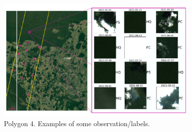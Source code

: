 \documentclass{beamer}
\begin{document}
\begin{frame}
    \begin{figure}
        \includegraphics[width=10cm]{Figures/v3/labeling/polygon_11.pdf}
        \caption{Polygon 4. Examples of some observation/labels.}  
        \centering
    \end{figure}
\end{frame}
\end{document}
